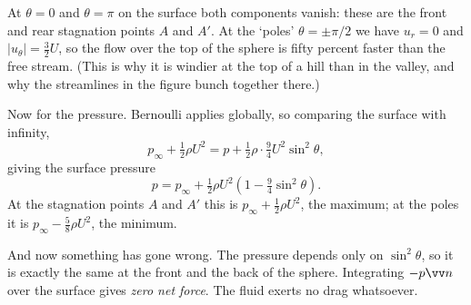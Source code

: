 \begin{example}
\begin{center}
	\end{center}
	At $\theta = 0$ and $\theta = \pi$ on the surface both components vanish: these are the front and rear stagnation points $A$ and $A'$. At the `poles' $\theta = \pm\pi/2$ we have $u_r = 0$ and $|u_\theta| = \tfrac{3}{2}U$, so the flow over the top of the sphere is fifty percent faster than the free stream. (This is why it is windier at the top of a hill than in the valley, and why the streamlines in the figure bunch together there.)

	Now for the pressure. Bernoulli applies globally, so comparing the surface with infinity,
	$$
	p_\infty + \tfrac{1}{2}\rho U^2 = p + \tfrac{1}{2}\rho \cdot \tfrac{9}{4}U^2 \sin^2\theta,
	$$
	giving the surface pressure
	$$
	p = p_\infty + \tfrac{1}{2}\rho U^2\left(1 - \tfrac{9}{4}\sin^2\theta\right).
	$$
	At the stagnation points $A$ and $A'$ this is $p_\infty + \tfrac{1}{2}\rho U^2$, the maximum; at the poles it is $p_\infty - \tfrac{5}{8}\rho U^2$, the minimum.

	And now something has gone wrong. The pressure depends only on $\sin^2\theta$, so it is exactly the same at the front and the back of the sphere. Integrating $-p\vv n$ over the surface gives \emph{zero net force}. The fluid exerts no drag whatsoever.
\end{example}

